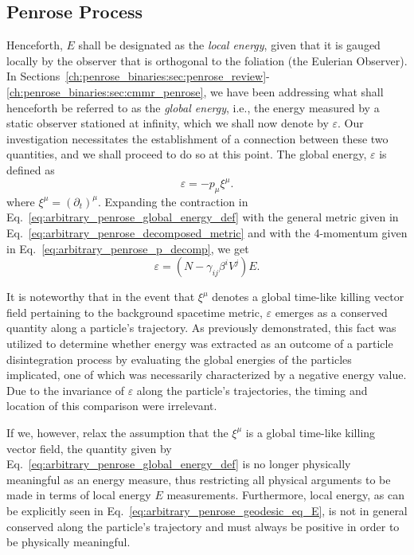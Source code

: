\subsection{Penrose Process}

Henceforth, $E$ shall be designated as the \emph{local energy}, given that it is gauged locally by the observer that is orthogonal to the foliation (the Eulerian Observer). In Sections~\ref{ch:penrose_binaries:sec:penrose_review}-\ref{ch:penrose_binaries:sec:cmmr_penrose}, we have been addressing what shall henceforth be referred to as the \emph{global energy}, i.e., the energy measured by a static observer stationed at infinity, which we shall now denote by $\varepsilon$. Our investigation necessitates the establishment of a connection between these two quantities, and we shall proceed to do so at this point. The global energy, $\varepsilon$ is defined as
%
\begin{equation}
  \varepsilon = - p_\mu \xi^\mu.
  \label{eq:arbitrary_penrose_global_energy_def}
\end{equation}
%
where $\xi^\mu = (\partial_t)^\mu$.
%
Expanding the contraction in Eq.~\eqref{eq:arbitrary_penrose_global_energy_def} with the general metric given in Eq.~\eqref{eq:arbitrary_penrose_decomposed_metric} and with the 4-momentum given in Eq.~\eqref{eq:arbitrary_penrose_p_decomp}, we get
%
\begin{equation}
  \varepsilon = \left( N - \gamma_{ij} \beta^i V^j \right) E.
  \label{eq:arbitrary_penrose_local_global_energy_relation}
\end{equation}

It is noteworthy that in the event that $\xi^\mu$ denotes a global time-like killing vector field pertaining to the background spacetime metric, $\varepsilon$ emerges as a conserved quantity along a particle's trajectory. As previously demonstrated, this fact was utilized to determine whether energy was extracted as an outcome of a particle disintegration process by evaluating the global energies of the particles implicated, one of which was necessarily characterized by a negative energy value. Due to the invariance of $\varepsilon$ along the particle's trajectories, the timing and location of this comparison were irrelevant.

If we, however, relax the assumption that the $\xi^\mu$ is a global time-like killing vector field, the quantity given by Eq.~\eqref{eq:arbitrary_penrose_global_energy_def} is no longer physically meaningful as an energy measure, thus restricting all physical arguments to be made in terms of local energy $E$ measurements. Furthermore, local energy, as can be explicitly seen in Eq.~\eqref{eq:arbitrary_penrose_geodesic_eq_E}, is not in general conserved along the particle's trajectory and must always be positive in order to be physically meaningful.

